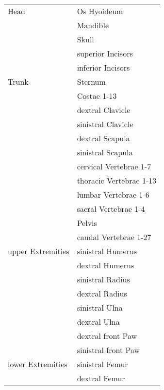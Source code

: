 \begin{table}
	\begin{center}
		\begin{tabular}{l l}
			\hline
			Head              & Os Hyoideum             \\
			                  & Mandible                \\
			                  & Skull                   \\
			                  & superior Incisors       \\
			                  & inferior Incisors       \\
			\hline
			Trunk             & Sternum                 \\
			                  & Costae 1-13             \\
			                  & dextral Clavicle        \\
			                  & sinistral Clavicle      \\
			                  & dextral Scapula         \\
			                  & sinistral Scapula       \\
			                  & cervical Vertebrae 1-7  \\
			                  & thoracic Vertebrae 1-13 \\
			                  & lumbar Vertebrae 1-6    \\
			                  & sacral Vertebrae 1-4    \\
			                  & Pelvis                  \\
			                  & caudal Vertebrae 1-27   \\
			\hline
			upper Extremities & sinistral Humerus       \\
			                  & dextral Humerus         \\
			                  & sinistral Radius        \\
			                  & dextral Radius          \\
			                  & sinistral Ulna          \\
			                  & dextral Ulna            \\
			                  & dextral front Paw       \\
			                  & sinistral front Paw     \\
			\hline
			lower Extremities & sinistral Femur         \\
			                  & dextral Femur           \\

\end{tabular}
\end{center}
\end{table}
